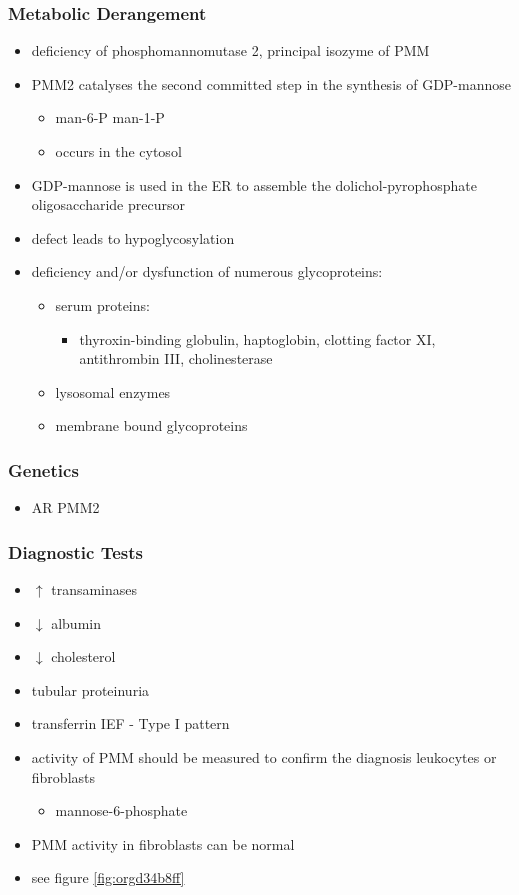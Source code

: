\documentclass[12pt]{scrartcl}
\begin{document}
\subsubsection{Metabolic Derangement}
\label{sec:org61a9390}
\begin{itemize}
\item deficiency of phosphomannomutase 2, principal isozyme of PMM
\item PMM2 catalyses the second committed step in the synthesis of GDP-mannose
\begin{itemize}
\item man-6-P \ce{<=>[PMM2]} man-1-P
\item occurs in the cytosol
\end{itemize}
\item GDP-mannose is used in the ER to assemble the dolichol-pyrophosphate
oligosaccharide precursor
\item defect leads to hypoglycosylation
\item deficiency and/or dysfunction of numerous glycoproteins:
\begin{itemize}
\item serum proteins:
\begin{itemize}
\item thyroxin-binding globulin, haptoglobin, clotting factor XI,
antithrombin III, cholinesterase
\end{itemize}
\item lysosomal enzymes
\item membrane bound glycoproteins
\end{itemize}
\end{itemize}

\subsubsection{Genetics}
\label{sec:org4df8dfe}
\begin{itemize}
\item AR PMM2
\end{itemize}

\subsubsection{Diagnostic Tests}
\label{sec:orga63db81}
\begin{itemize}
\item \(\uparrow\) transaminases
\item \(\downarrow\) albumin
\item \(\downarrow\) cholesterol
\item tubular proteinuria
\item transferrin IEF - Type I pattern
\item activity of PMM should be measured to confirm the diagnosis
leukocytes or fibroblasts
\begin{itemize}
\item\relax [2-H\textsuperscript{3}]mannose-6-phosphate
\end{itemize}
\item PMM activity in fibroblasts can be normal
\item see figure \ref{fig:orgd34b8ff}
\end{itemize}
\end{document}
